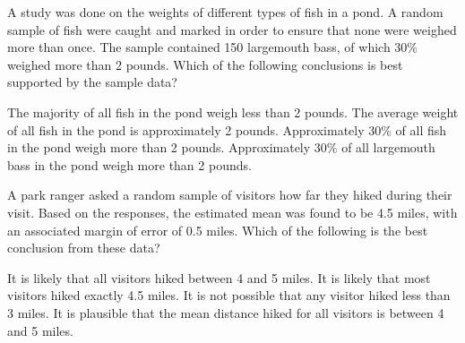 \question[1]
A study was done on the weights of different types of fish in a pond. A random sample of fish were caught and marked in order to ensure that none were weighed more than once. The sample contained 150 largemouth bass, of which $30\%$ weighed more than 2 pounds. Which of the following conclusions is best supported by the sample data?
\begin{choices}
  \choice The majority of all fish in the pond weigh less than 2 pounds.
  \choice The average weight of all fish in the pond is approximately 2 pounds.
  \choice Approximately $30\%$ of all fish in the pond weigh more than 2 pounds.
  \CorrectChoice Approximately $30\%$ of all largemouth bass in the pond weigh more than 2 pounds.
\end{choices}


\newpage

\question[1]
A park ranger asked a random sample of visitors how far they hiked during their visit. Based on the responses, the estimated mean was found to be 4.5 miles, with an associated margin of error of 0.5 miles. Which of the following is the best conclusion from these data?
\begin{choices}
  \choice It is likely that all visitors hiked between 4 and 5 miles.
  \choice It is likely that most visitors hiked exactly 4.5 miles.
  \choice It is not possible that any visitor hiked less than 3 miles.
  \CorrectChoice It is plausible that the mean distance hiked for all visitors is between 4 and 5 miles.
\end{choices}

  

